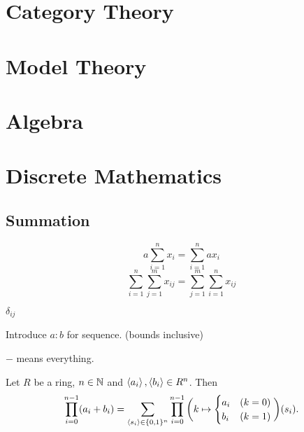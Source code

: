 \documentclass{report}
\begin{document}
\part{Category Theory}
\setcounter{chapter}{0} %


\part{Model Theory}
\setcounter{chapter}{0} %


\part{Algebra}
\setcounter{chapter}{0} %


\part{Discrete Mathematics}
\setcounter{chapter}{0} %
\chapter{Summation}
\[ a\sum_{i=1}^n x_i = \sum_{i=1}^n ax_i \]
\[ \sum_{i=1}^n\sum_{j=1}^m x_{ij} = \sum_{j=1}^m\sum_{i=1}^n x_{ij} \]

$\delta_{ij}$

Introduce $a:b$ for sequence. (bounds inclusive)

$-$ means everything.

\begin{proposition} \label{productOfSum}
Let $R$ be a ring, $n\in \mathbb{N}$ and $\left\langle a_i \right\rangle,\left\langle b_i \right\rangle\in R^n$. Then
\[ \prod_{i=0}^{n-1}(a_i + b_i) = \sum_{\left\langle s_i \right\rangle\in \{0,1\}^n}\prod_{i=0}^{n-1}\bigg(k\mapsto \begin{cases}
a_i & (k=0) \\ b_i & (k=1)
\end{cases}\bigg)(s_i). \]
\end{proposition}
\end{document}
